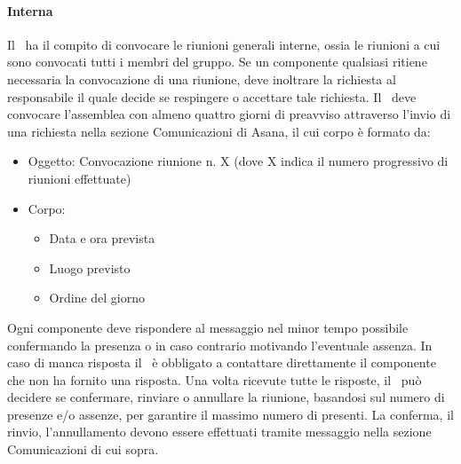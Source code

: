 \documentclass[../NormeDiProgetto.tex]{subfiles}
\begin{document}
				\paragraph{Interna\\}
				Il \responsabilediprogetto\ ha il compito di convocare le riunioni generali interne, ossia
				le riunioni a cui sono convocati tutti i membri del gruppo.
				Se un componente qualsiasi ritiene necessaria la convocazione di una riunione, deve
				inoltrare la richiesta al responsabile il quale decide se respingere o accettare
				tale richiesta.
				Il \responsabilediprogetto\ deve convocare l'assemblea con almeno quattro giorni di preavviso
				attraverso l'invio di una richiesta nella sezione Comunicazioni di Asana, il cui
				corpo è formato da:
				\begin{itemize}
					\item Oggetto: Convocazione riunione n. X (dove X indica il numero progressivo
					di riunioni effettuate)
					\item Corpo:
					\begin{itemize}
						\item Data e ora prevista
						\item Luogo previsto
						\item Ordine del giorno
					\end{itemize}
				\end{itemize}
				Ogni componente deve rispondere al messaggio nel minor tempo possibile confermando
				la presenza o in caso contrario motivando l'eventuale assenza. In caso di manca risposta
				il \responsabilediprogetto\ è obbligato a contattare direttamente il componente che non
				ha fornito una risposta. Una volta ricevute tutte le risposte, il \responsabilediprogetto\
				può decidere se confermare, rinviare o annullare la riunione, basandosi sul numero di
				presenze e/o assenze, per garantire il massimo numero di presenti. La conferma, il rinvio,
				l'annullamento devono essere effettuati tramite messaggio nella sezione Comunicazioni di cui
				sopra.
\end{document}
